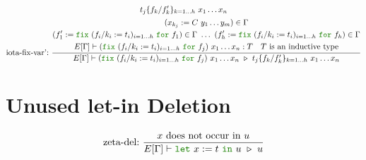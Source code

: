 \documentclass[a4paper,fleqn]{article}
\newcommand{\kwlet}{\mbox{\color{mygreen}\ttfamily let}}
\newcommand{\kwin}{\mbox{\color{mygreen}\ttfamily in}}
\newcommand{\kwfix}{\mbox{\color{mygreen}\ttfamily fix}}
\newcommand{\kwfor}{\mbox{\color{mygreen}\ttfamily for}}
\newcommand{\letin}[3]{\kwlet~#1:=#2~\kwin~#3}
\newcommand{\fix}[4]{\kwfix~(#1 := #2)_{#3}~\kwfor~#4}
\newcommand{\subst}[3]{#1\{#2/#3\}}
\begin{document}
\begin{gather*}
{\begin{aligned}
                  &\quad \subst{t_j}{f_k}{f'_k}_{k=1\dots h} ~x_1 \dots x_n
      \end{aligned}
    } \\
  \text{iota-fix-var':}~
    \dfrac
    {
      \begin{gathered}
        (x_{k_j} := C~y_1\ldots y_m) \in \Gamma \\
        (f'_1 := \fix{f_i/k_i}{t_i}{i=1\dots h}{f_1}) \in \Gamma ~\dots~
        (f'_h := \fix{f_i/k_i}{t_i}{i=1\dots h}{f_h}) \in \Gamma \\
        E[\Gamma] \vdash (\fix{f_i/k_i}{t_i}{i=1\dots h}{f_j})~x_1\ldots x_n : T \quad
        \text{$T$ is an inductive type}
      \end{gathered}
    }{
      E[\Gamma] \vdash
      (\fix{f_i/k_i}{t_i}{i=1\dots h}{f_j})~x_1\ldots x_n
      ~\triangleright~
      \subst{t_j}{f_k}{f'_k}_{k=1\dots h} ~x_1 \dots x_n
    }
\end{gather*}

\section{Unused let-in Deletion}\label{sec:let-in-deletion}
\begin{gather*}
  \text{zeta-del:}~
    \dfrac{
      \text{$x$ does not occur in $u$}
    }{E[\Gamma] \vdash \letin{x}{t}{u}
                       ~\triangleright~
                       u
    }
\end{gather*}
\end{document}
